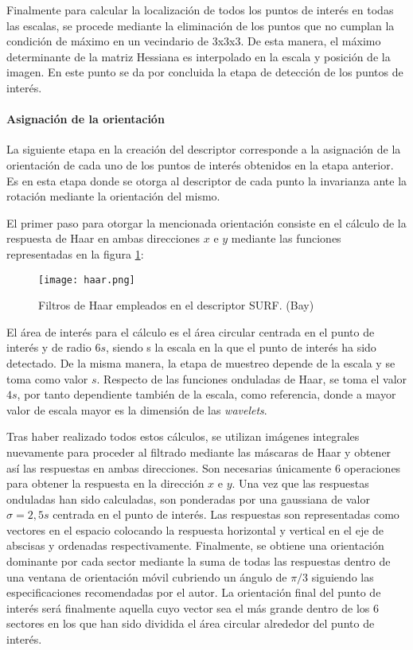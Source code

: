 Finalmente para calcular la localización de todos los puntos de interés en todas las escalas, se procede mediante la eliminación de los puntos que no cumplan la condición de máximo en un vecindario de 3x3x3. De esta manera, el máximo determinante de la matriz Hessiana es interpolado en la escala y posición de la imagen. En este punto se da por concluida la etapa de detección de los puntos de interés.

\paragraph{Asignación de la orientación} 
La siguiente etapa en la creación del descriptor corresponde a la asignación de la orientación de cada uno de los puntos de interés obtenidos en la etapa anterior.
Es en esta etapa donde se otorga al descriptor de cada punto la invarianza ante la rotación mediante la orientación del mismo. 

El primer paso para otorgar la mencionada orientación consiste en el cálculo de la respuesta de Haar en ambas direcciones $x$ e $y$ mediante las funciones representadas en la figura \ref{fig:haar}:

\begin{figure}
  \centering        
  \texttt{[image: haar.png]}
  \caption{Filtros de Haar empleados en el descriptor SURF. (Bay)}
  \label{fig:haar}
\end{figure}

El área de interés para el cálculo es el área circular centrada en el punto de interés y de radio $6s$, siendo s la escala en la que el punto de interés ha sido detectado. De la misma manera, la etapa de muestreo depende de la escala y se toma como valor $s$. Respecto de las funciones onduladas de Haar, se toma el valor $4s$, por tanto dependiente también de la escala, como referencia, donde a mayor valor de escala mayor es la dimensión de las \emph{wavelets}.

Tras haber realizado todos estos cálculos, se utilizan imágenes integrales nuevamente para proceder al filtrado mediante las máscaras de Haar y obtener así las respuestas en ambas direcciones. Son necesarias únicamente 6 operaciones para obtener la respuesta en la dirección $x$ e $y$. Una vez que las respuestas onduladas han sido calculadas, son ponderadas por una gaussiana de valor $\sigma = 2,5s$ centrada en el punto de interés. Las respuestas son representadas como vectores en el espacio colocando la respuesta horizontal y vertical en el eje de abscisas y ordenadas respectivamente. Finalmente, se obtiene una orientación dominante por cada sector mediante la suma de todas las respuestas dentro de una ventana de orientación móvil cubriendo un ángulo de $\pi/3$ siguiendo las especificaciones recomendadas por el autor. La orientación final del punto de interés será finalmente aquella cuyo vector sea el más grande dentro de los 6 sectores en los que han sido dividida el área circular alrededor del punto de interés. 

